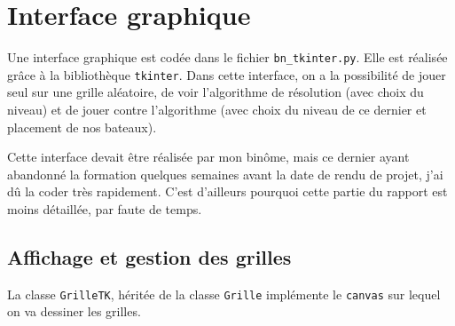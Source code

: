 \chapter{Interface graphique}

Une interface graphique est codée dans le fichier \texttt{bn\_tkinter.py}. Elle est réalisée grâce à la bibliothèque \texttt{tkinter}. Dans cette interface, on a la possibilité de jouer seul sur une grille aléatoire, de voir l'algorithme de résolution (avec choix du niveau) et de jouer contre l'algorithme (avec choix du niveau de ce dernier et placement de nos bateaux).

Cette interface devait être réalisée par mon binôme, mais ce dernier ayant abandonné la formation quelques semaines avant la date de rendu de projet, j'ai dû la coder très rapidement. C'est d'ailleurs  pourquoi cette partie du rapport est moins détaillée, par faute de temps.

%
%
%
%
%
%

\section{Affichage et gestion des grilles}
La classe \texttt{GrilleTK}, héritée de la classe \texttt{Grille} implémente le \texttt{canvas} sur lequel on va dessiner les grilles.

